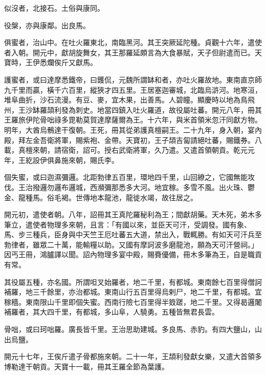 \begin{pinyinscope}
 似沒者，北接石。土俗與康同。



 役槃，亦與康鄰。出良馬。



 俱蜜者，治山中。在吐火羅東北，南臨黑河。其王突厥延陀種。貞觀十六年，遣使者入朝。開元中，獻胡旋舞女，其王那羅延頗言為大食暴賦，天子但尉遣而已。天寶時，王伊悉爛俟斤又獻馬。



 護蜜者，或曰達摩悉鐵帝，曰鑊侃，元魏所謂缽和者，亦吐火羅故地。東南直京師九千里而贏，橫千六百里，縱狹才四五里。王居塞迦審城，北臨烏滸河。地寒洹，堆阜曲折，沙石流漫。有豆、麥，宜木果，出善馬。人碧瞳。顯慶時以地為鳥飛州，王沙缽羅頡利發為刺史。地當四鎮入吐火羅道，故役屬吐蕃。開元八年，冊其王羅旅伊陀骨咄祿多毘勒莫賀達摩薩爾為王。十六年，與米首領米忽汗同獻方物。明年，大酋烏鶻達干復朝。王死，冊其從弟護真檀嗣王。二十九年，身入朝，宴內殿，拜左金吾衛將軍，賜紫袍、金帶。天寶初，王子頡吉匐請絕吐蕃，賜鐵券。八載，真檀來朝，請宿衛，詔可。授右武衛將軍，久乃遣。又遣首領朝貢。乾元元年，王紇設伊俱鼻施來朝，賜氏李。



 個失蜜，或曰迦濕彌邏。北距勃律五百里，環地四千里，山回繚之，它國無能攻伐。王治撥邏勿邏布邏城，西瀕彌那悉多大河。地宜稼。多雪不風。出火珠、鬱金、龍種馬。俗毛褐。世傳地本龍池，龍徙水竭，故往居之。



 開元初，遣使者朝。八年，詔冊其王真陀羅秘利為王；間獻胡藥。天木死，弟木多筆立，遣使者物理多來朝，且言：「有國以來，並臣天可汗，受調發。國有象、馬、步三種兵，臣身與中天竺王厄吐蕃五大道，禁出入，戰輒勝。有如天可汗兵至勃律者，雖眾二十萬，能輸糧以助。又國有摩訶波多磨龍池，願為天可汗營祠。」因丐王冊，鴻臚譯以聞。詔內物理多宴中殿，賜賚優備，冊木多筆為王，自是職貢有常。



 其役屬五種，亦名國。所謂呾叉始羅者，地二千里，有都城。東南餘七百里得僧訶補羅，地三千餘里，亦治都城。東南山行五百里得烏剌尸，地二千里，有都城。宜稼穡。東南限山千里即個失蜜。西南行險七百里得半笯蹉，地二千里。又得曷邏闍補羅者，其大四千里，有都城，多山阜，人驍勇。五種皆無君長雲。



 骨咄，或曰珂咄羅。廣長皆千里。王治思助建城。多良馬、赤豹。有四大鹽山，山出烏鹽。



 開元十七年，王俟斤遣子骨都施來朝。二十一年，王頡利發獻女樂，又遣大首領多博勒達干朝貢。天寶十一載，冊其王羅全節為葉護。




\end{pinyinscope}
